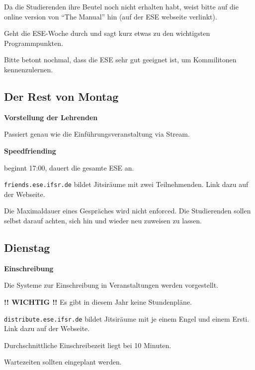 \documentclass[a4paper,12pt]{scrreprt}
\begin{document}
\begin{itemize*}
    \item Da die Studierenden ihre Beutel noch nicht erhalten habt, weist bitte auf die online version von \enquote{The Manual} hin (auf der ESE webseite verlinkt).
    \item Geht die ESE-Woche durch und sagt kurz etwas zu den wichtigsten Programmpunkten.
    \item Bitte betont nochmal, dass die ESE sehr gut geeignet ist, um Kommilitonen kennenzulernen.
\end{itemize*}


\subsection{Der Rest von Montag}

\textbf{Vorstellung der Lehrenden}
\begin{itemize*}
    \item Passiert genau wie die Einführungsveranstaltung via Stream.
\end{itemize*}

\textbf{Speedfriending}
\begin{itemize*}
    \item beginnt 17:00, dauert die gesamte ESE an.
    \item \texttt{friends.ese.ifsr.de} bildet Jitsiräume mit zwei Teilnehmenden. Link dazu auf der Webseite.
    \item Die Maximaldauer eines Gespräches wird nicht enforced. Die Studierenden sollen selbst darauf achten, sich hin und wieder neu zuweisen zu lassen.
\end{itemize*}


\subsection{Dienstag}

\textbf{Einschreibung}
\begin{itemize*}
    \item Die Systeme zur Einschreibung in Veranstaltungen werden vorgestellt.
    \item \textbf{!! WICHTIG !!} Es gibt in diesem Jahr keine Stundenpläne.
    \item \texttt{distribute.ese.ifsr.de} bildet Jitsiräume mit je einem Engel und einem Ersti. Link dazu auf der Webseite.
    \item Durchschnittliche Einschreibezeit liegt bei 10 Minuten.
    \item Wartezeiten sollten eingeplant werden.
\end{itemize*}
\end{document}

